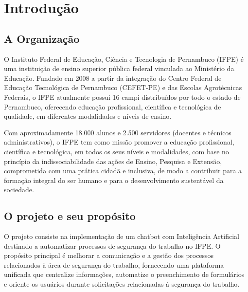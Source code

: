\documentclass[12pt,a4paper]{article}
\renewcommand{\arraystretch}{1.2}
\begin{document}
\begin{table}[htbp]
\centering
\renewcommand{\arraystretch}{1.3}
\end{table}

\clearpage
\tableofcontents
\thispagestyle{empty}
\clearpage

\section{Introdução}

\subsection{A Organização}
O Instituto Federal de Educação, Ciência e Tecnologia de Pernambuco (IFPE) é uma instituição de ensino superior pública federal vinculada ao Ministério da Educação. Fundado em 2008 a partir da integração do Centro Federal de Educação Tecnológica de Pernambuco (CEFET-PE) e das Escolas Agrotécnicas Federais, o IFPE atualmente possui 16 campi distribuídos por todo o estado de Pernambuco, oferecendo educação profissional, científica e tecnológica de qualidade, em diferentes modalidades e níveis de ensino.

Com aproximadamente 18.000 alunos e 2.500 servidores (docentes e técnicos administrativos), o IFPE tem como missão promover a educação profissional, científica e tecnológica, em todos os seus níveis e modalidades, com base no princípio da indissociabilidade das ações de Ensino, Pesquisa e Extensão, comprometida com uma prática cidadã e inclusiva, de modo a contribuir para a formação integral do ser humano e para o desenvolvimento sustentável da sociedade.

\subsection{O projeto e seu propósito}
O projeto consiste na implementação de um chatbot com Inteligência Artificial destinado a automatizar processos de segurança do trabalho no IFPE. O propósito principal é melhorar a comunicação e a gestão dos processos relacionados à área de segurança do trabalho, fornecendo uma plataforma unificada que centralize informações, automatize o preenchimento de formulários e oriente os usuários durante solicitações relacionadas à segurança do trabalho.
\end{document}
